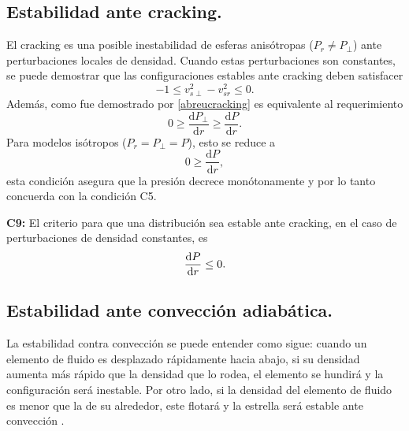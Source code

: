 \subsection*{Estabilidad ante cracking.}
\noindent El cracking es una posible inestabilidad de esferas anisótropas ($P_r \neq P_{\perp}$) ante perturbaciones locales de densidad. Cuando estas perturbaciones son constantes, se puede demostrar \cite{Abreu2007} que las configuraciones estables ante cracking deben satisfacer
\begin{equation}\label{abreucracking}
    -1 \leq v_{s \perp}^{2}-v_{s r}^{2} \leq 0.
\end{equation}
Además, como fue demostrado por \cite{Ivanov2017} \eqref{abreucracking} es equivalente al requerimiento
\begin{equation}
    0 \geq \frac{\mathrm{d} P_{\perp}}{\mathrm{d} r} \geq \frac{\mathrm{d} P}{\mathrm{d} r}.
\end{equation}
Para modelos isótropos ($P_r=P_{\perp}=P$), esto se reduce a 
\begin{equation}
    0 \geq \frac{\mathrm{d} P}{\mathrm{d} r},
\end{equation}
esta condición asegura que la presión decrece monótonamente y por lo tanto concuerda con la condición C5.

\textbf{C9:} El criterio para que una distribución sea estable ante cracking, en el caso de perturbaciones de densidad constantes, es 
\begin{equation}
    \dv{P}{r} \leq 0.
\end{equation}


\subsection*{Estabilidad ante convección adiabática.}

\noindent La estabilidad contra convección se puede entender como sigue: cuando un elemento de fluido es desplazado rápidamente hacia abajo, si su densidad aumenta más rápido que la densidad que lo rodea, el elemento se hundirá y la configuración será inestable. Por otro lado, si la densidad del elemento de fluido es menor que la de su alrededor, este flotará y la estrella será estable ante convección \cite{Bondi1964a}. 

